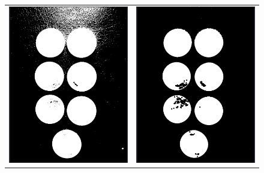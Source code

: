 	\begin{figure}[!h]
		\centering
		\begin{tabular}{cc}
			\includegraphics[width=7.5cm]{Imagenes/op_morf_monedas_1.png} & \includegraphics[width=7.5cm]{Imagenes/op_morf_monedas_2.png} \\

\end{tabular}
\end{figure}
